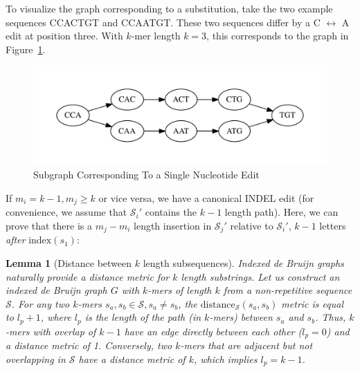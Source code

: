 \documentclass[phd]{ucbthesis}
\newtheorem{lemma}{Lemma}
\begin{document}
To visualize the graph corresponding to a substitution, take the two example sequences \textsc{CCACTGT}
and \textsc{CCAATGT}. These two sequences differ by a \textsc{C} $\leftrightarrow$ \textsc{A} edit at
position three. With $k$-mer length $k = 3$, this corresponds to the graph in Figure~\ref{fig:sne}.

\begin{figure}[h]
\begin{center}
\includegraphics[width=0.95\linewidth, clip=true, trim=0 39 0 39]{graphs/sne.pdf}
\end{center}
\caption{Subgraph Corresponding To a Single Nucleotide Edit}
\label{fig:sne}
\end{figure}

If $m_i = k - 1, m_j \ge k$ or vice versa, we have a canonical INDEL edit (for convenience, we assume
that $\mathcal{S}_i'$ contains the $k - 1$ length path). Here, we can prove that there is a $m_j - m_i$
length insertion in $\mathcal{S}_j'$ relative to $\mathcal{S}_i'$, $k - 1$ letters \emph{after}
$\text{index}(s_1)$:

\begin{lemma}[Distance between $k$ length subsequences]
\label{lem:minimum-distance}
\emph{Indexed de Bruijn} graphs naturally provide a distance metric for $k$ length substrings. Let us construct an
indexed de Bruijn graph $G$ with $k$-mers of length $k$ from a non-repetitive sequence $\mathcal{S}$.
For any two $k$-mers $s_a, s_b \in \mathcal{S}, s_a \ne s_b$, the
$\text{distance}_\mathcal{S}(s_a, s_b)$ metric is equal to $l_p + 1$, where $l_p$ is the length of the
path (in $k$-mers) between $s_a$ and $s_b$. Thus, $k$-mers with overlap of $k - 1$ have an edge
directly between each other ($l_p = 0$) and a distance metric of 1. Conversely, two $k$-mers that are
adjacent but not overlapping in $\mathcal{S}$ have a distance metric of $k$, which implies $l_p = k - 1$.
\end{lemma}
\end{document}
